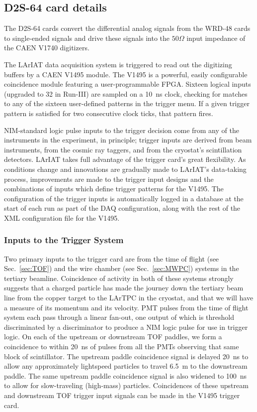\subsection*{D2S-64 card details}
The D2S-64 cards convert the differential analog signals from the WRD-48 cards to single-ended signals and drive these signals into the $50 \Omega$ input impedance of the CAEN V1740 digitizers.

The LArIAT data acquisition system is triggered to read out the digitizing buffers by a CAEN V1495 module. The V1495 is a powerful, easily configurable coincidence module featuring a user-programmable FPGA.  Sixteen logical inputs (upgraded to 32 in Run-III) are sampled on a 10~ns clock, checking for matches to any of the sixteen user-defined patterns in the trigger menu.  If a given trigger pattern is satisfied for two consecutive clock ticks, that pattern fires. 

NIM-standard logic pulse inputs to the trigger decision come from any of the instruments in the experiment, in principle; trigger inputs are derived from beam instruments, from the cosmic ray taggers, and from the cryostat's scintillation detectors. LArIAT takes full advantage of the trigger card's great flexibility.  As conditions change and innovations are gradually made to LArIAT's data-taking process, improvements are made to the trigger input designs and the combinations of inputs which define trigger patterns for the V1495.  The configuration of the trigger inputs is automatically logged in a database at the start of each run as part of the DAQ configuration, along with the rest of the XML configuration file for the V1495.

\subsubsection{Inputs to the Trigger System}

Two primary inputs to the trigger card are from the time of flight (see Sec.~\ref{sec:TOF}) and the wire chamber (see Sec.~\ref{sec:MWPC}) systems in the tertiary beamline.  Coincidence of activity in both of these systems strongly suggests that a charged particle has made the journey down the tertiary beam line from the copper target to the LArTPC in the cryostat, and that we will have a measure of its momentum and its velocity. PMT pulses from the time of flight system each pass through a 
linear fan-out, one output of which is threshold discriminated by a
discriminator to produce a NIM logic pulse for use in trigger logic.  On each of the upstream or downstream TOF paddles, we form a coincidence to within 20~ns of pulses from all the PMTs observing that same block of scintillator.  The upstream paddle coincidence signal is delayed 20~ns to allow any approximately lightspeed particles to travel 6.5~m to the downstream paddle.  The same upstream paddle coincidence signal is also widened to 100~ns to allow for slow-traveling (high-mass) particles.  Coincidences of these upstream and downstream TOF trigger input signals can be made in the V1495 trigger card.

